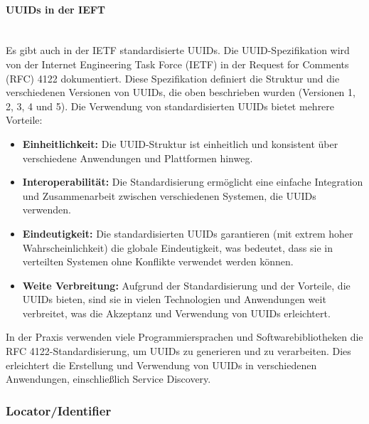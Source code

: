 \documentclass[../vs-script-first-v01.tex]{subfiles}
\begin{document}
\paragraph{UUIDs in der IEFT}\mbox{}\\
Es gibt auch in der IETF standardisierte UUIDs. Die UUID-Spezifikation wird von der Internet Engineering Task Force (IETF) in der Request for Comments (RFC) 4122 dokumentiert. Diese Spezifikation definiert die Struktur und die verschiedenen Versionen von UUIDs, die oben beschrieben wurden (Versionen 1, 2, 3, 4 und 5). Die Verwendung von standardisierten UUIDs bietet mehrere Vorteile:
\begin{itemize}
\item \textbf{Einheitlichkeit:} Die UUID-Struktur ist einheitlich und konsistent über verschiedene Anwendungen und Plattformen hinweg.
\item \textbf{Interoperabilität:} Die Standardisierung ermöglicht eine einfache Integration und Zusammenarbeit zwischen verschiedenen Systemen, die UUIDs verwenden.
\item \textbf{Eindeutigkeit:} Die standardisierten UUIDs garantieren (mit extrem hoher Wahrscheinlichkeit) die globale Eindeutigkeit, was bedeutet, dass sie in verteilten Systemen ohne Konflikte verwendet werden können.
\item \textbf{Weite Verbreitung:} Aufgrund der Standardisierung und der Vorteile, die UUIDs bieten, sind sie in vielen Technologien und Anwendungen weit verbreitet, was die Akzeptanz und Verwendung von UUIDs erleichtert.
\end{itemize}
In der Praxis verwenden viele Programmiersprachen und Softwarebibliotheken die RFC 4122-Standardisierung, um UUIDs zu generieren und zu verarbeiten. Dies erleichtert die Erstellung und Verwendung von UUIDs in verschiedenen Anwendungen, einschließlich Service Discovery.


\subsubsection{Locator/Identifier}
\end{document}
